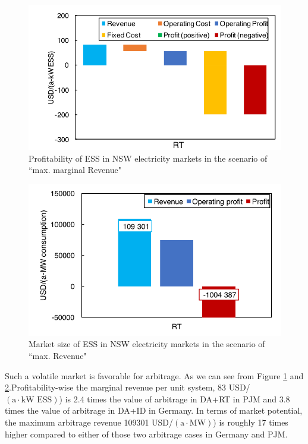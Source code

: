 \begin{figure}[h!]
	\centering
	\includegraphics[width=0.9\linewidth]{Figures/NSW_ESS_profitability}
	\caption{Profitability of ESS in NSW electricity markets in the scenario of ``max. marginal Revenue"}
	\label{fig:nsw-ess-profitability}
\end{figure}

\begin{figure}[h!]
	\centering
	\includegraphics[width=0.9\linewidth]{Figures/NSW_ESS}
	\caption{Market size of ESS in NSW electricity markets in the scenario of ``max. Revenue"}
	\label{fig:nsw-ess}
\end{figure}

Such a volatile market is favorable for arbitrage. As we can see from Figure \ref{fig:nsw-ess-profitability} and \ref{fig:nsw-ess}.Profitability-wise the marginal revenue per unit system, 83 USD/$(\text{a} \cdot \text{kW ESS})$) is 2.4 times the value of arbitrage in DA+RT in PJM and 3.8 times the value of arbitrage in DA+ID in Germany. In terms of market potential, the maximum arbitrage revenue \num{109301} USD/$(\text{a} \cdot \text{MW})$) is roughly 17 times higher compared to either of those two arbitrage cases in Germany and PJM.

